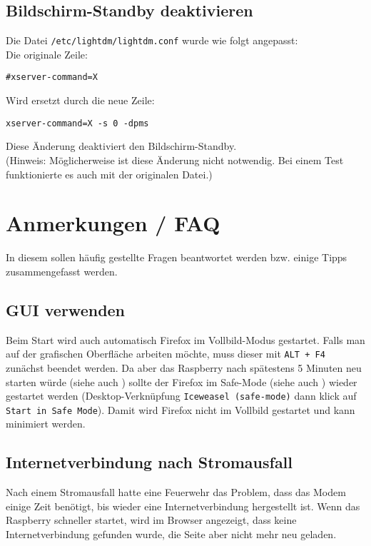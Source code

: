 \subsection{Bildschirm-Standby deaktivieren}
Die Datei \lstinline|/etc/lightdm/lightdm.conf| wurde wie folgt angepasst:\\
Die originale Zeile:
\begin{lstlisting}
#xserver-command=X
\end{lstlisting}
Wird ersetzt durch die neue Zeile:
\begin{lstlisting}
xserver-command=X -s 0 -dpms
\end{lstlisting}
Diese Änderung deaktiviert den Bildschirm-Standby.\\
(Hinweis: Möglicherweise ist diese Änderung nicht notwendig. Bei einem Test funktionierte es auch mit der originalen Datei.)

\section{Anmerkungen / FAQ}
\label{sec:faq}
In diesem sollen häufig gestellte Fragen beantwortet werden bzw. einige Tipps zusammengefasst werden.

\subsection{GUI verwenden}
Beim Start wird auch automatisch Firefox im Vollbild-Modus gestartet. Falls man auf der grafischen Oberfläche arbeiten möchte, muss dieser mit \lstinline|ALT + F4| zunächst beendet werden.
Da aber das Raspberry nach spätestens 5 Minuten neu starten würde (siehe auch ) sollte der Firefox im Safe-Mode (siehe auch ) wieder gestartet werden (Desktop-Verknüpfung \lstinline|Iceweasel (safe-mode)| dann klick auf \lstinline|Start in Safe Mode|).
Damit wird Firefox nicht im Vollbild gestartet und kann minimiert werden.

\subsection{Internetverbindung nach Stromausfall}
\label{sec:stromausfall}
Nach einem Stromausfall hatte eine Feuerwehr das Problem, dass das Modem einige Zeit benötigt, bis wieder eine Internetverbindung hergestellt ist.
Wenn das Raspberry schneller startet, wird im Browser angezeigt, dass keine Internetverbindung gefunden wurde, die Seite aber nicht mehr neu geladen.

